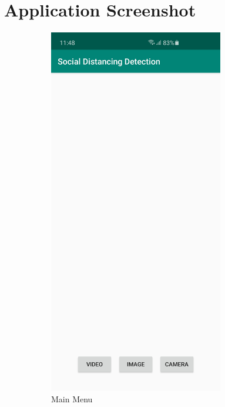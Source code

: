 \chapter{Application Screenshot}\label{intro}

    \begin{figure}[h!]
        \centering
        \begin{subfigure}{.5\textwidth}
        \centering
        \includegraphics[width=3in]{images/appendix-b/sh-main.jpg}
        \caption{Main Menu}
        \label{appendix-b:mainMenu}
        \end{subfigure}%
        \begin{subfigure}{.5\textwidth}
        \centering

\end{subfigure}
\end{figure}

